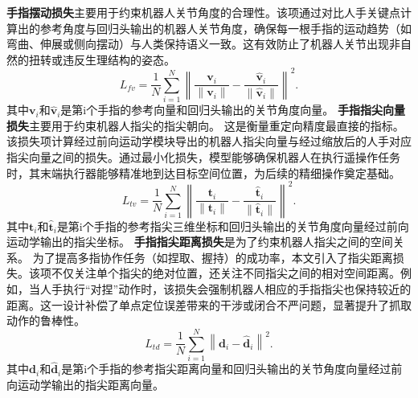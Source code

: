 \textbf{手指摆动损失}主要用于约束机器人关节角度的合理性。该项通过对比人手关键点计算出的参考角度与回归头输出的机器人关节角度，确保每一根手指的运动趋势（如弯曲、伸展或侧向摆动）与人类保持语义一致。这有效防止了机器人关节出现非自然的扭转或违反生理结构的姿态。
\begin{equation}
L_{fv} = \frac{1}{N}\sum_{i=1}^{N} \left\| \frac{\mathbf{v}_{i}}{\|\mathbf{v}_{i}\|} - \frac{\hat{\mathbf{v}}_{i}}{\|\hat{\mathbf{v}}_{i}\|} \right\|^2.
\end{equation}
其中$\mathbf{v}_{i}$和$\hat{\mathbf{v}}_{i}$是第i个手指的参考向量和回归头输出的关节角度向量。
\textbf{手指指尖向量损失}主要用于约束机器人指尖的指尖朝向。
这是衡量重定向精度最直接的指标。该损失项计算经过前向运动学模块导出的机器人指尖向量与经过缩放后的人手对应指尖向量之间的损失。通过最小化损失，模型能够确保机器人在执行遥操作任务时，其末端执行器能够精准地到达目标空间位置，为后续的精细操作奠定基础。
\begin{equation}
L_{tv} = \frac{1}{N}\sum_{i=1}^{N} \left\| \frac{\mathbf{t}_{i}}{\|\mathbf{t}_{i}\|} - \frac{\hat{\mathbf{t}}_{i}}{\|\hat{\mathbf{t}}_{i}\|} \right\|^2.
\end{equation}
其中$\mathbf{t}_{i}$和$\hat{\mathbf{t}}_{i}$是第i个手指的参考指尖三维坐标和回归头输出的关节角度向量经过前向运动学输出的指尖坐标。
\textbf{手指指尖距离损失}是为了约束机器人指尖之间的空间关系。
为了提高多指协作任务（如捏取、握持）的成功率，本文引入了指尖距离损失。该项不仅关注单个指尖的绝对位置，还关注不同指尖之间的相对空间距离。例如，当人手执行“对捏”动作时，该损失会强制机器人相应的手指指尖也保持较近的距离。这一设计补偿了单点定位误差带来的干涉或闭合不严问题，显著提升了抓取动作的鲁棒性。
\begin{equation}
L_{td} = \frac{1}{N}\sum_{i=1}^{N} \left\| \mathbf{d}_{i} - \hat{\mathbf{d}}_{i} \right\|^2.
\end{equation}
其中$\mathbf{d}_{i}$和$\hat{\mathbf{d}}_{i}$是第i个手指的参考指尖距离向量和回归头输出的关节角度向量经过前向运动学输出的指尖距离向量。

